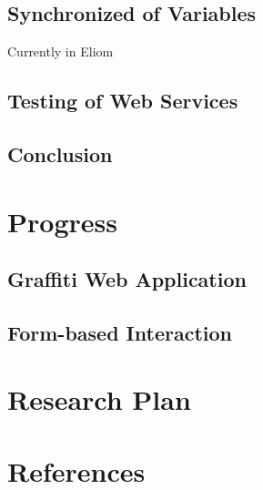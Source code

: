 \documentclass[12pt,fullpage]{article}
\begin{document}
\subsection{Synchronized of Variables}
Currently in Eliom
\subsection{Testing of Web Services}

\subsection{Conclusion}



\section{Progress}
\subsection{Graffiti Web Application}

\subsection{Form-based Interaction}
\section{Research Plan}
\section{References}
\printbibliography
\end{document}
